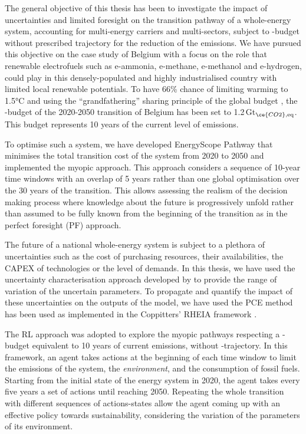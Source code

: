 

The general objective of this thesis has been to investigate the impact of uncertainties and limited foresight on the transition pathway of a whole-energy system, accounting for multi-energy carriers and multi-sectors, subject to -budget without prescribed trajectory for the reduction of the emissions.  We have pursued this objective on the case study of Belgium with a focus on the role that renewable electrofuels such as e-ammonia, e-methane, e-methanol and e-hydrogen, could play in this densely-populated and highly industrialised country with limited local renewable potentials. To have 66\% chance of limiting warming to 1.5°C \cite{IPCC_CO2_budget} and using the ``grandfathering'' sharing principle of the global budget \cite{knight2013grandfathering}, the -budget of the 2020-2050 transition of Belgium has been set to 1.2\,Gt$_{\ce{CO2},\text{eq}}$. This budget represents 10 years of the current level of emissions.

To optimise such a system, we have developed EnergyScope Pathway that minimises the total transition cost of the system from 2020 to 2050 and implemented the myopic approach. This approach considers a sequence of 10-year time windows with an overlap of 5 years rather than one global optimisation over the 30 years of the transition. This allows assessing the realism of the decision making process where knowledge about the future is progressively unfold rather than assumed to be fully known from the beginning of the transition as in the perfect foresight (PF) approach. 

The future of a national whole-energy system is subject to a plethora of uncertainties such as the cost of purchasing resources, their availabilities, the \acrfull{CAPEX} of technologies or the level of demands. In this thesis, we have used the uncertainty characterisation approach developed by \citet{moret2016strategic} to provide the range of variation of the uncertain parameters. To propagate and quantify the impact of these uncertainties on the outputs of the model, we have used the \acrfull{PCE} method has been used as implemented in the Coppitters' RHEIA framework \cite{coppittersthesis}.

The \acrfull{RL} approach was adopted to explore the myopic pathways respecting a -budget equivalent to 10 years of current emissions, without -trajectory. In this framework, an agent takes actions at the beginning of each time window to limit the emissions of the system, the \textit{environment}, and the consumption of fossil fuels. Starting from the initial state of the energy system in 2020, the agent takes every five years a set of actions until reaching 2050. Repeating the whole transition with different sequences of actions-states allow the agent coming up with an effective policy towards sustainability, considering the variation of the parameters of its environment.


